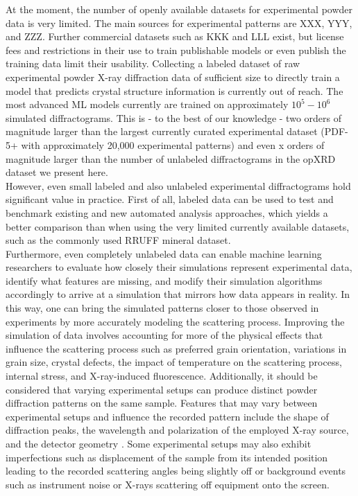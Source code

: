 At the moment, the number of openly available datasets for experimental powder data is very limited. The main sources for experimental patterns are XXX, YYY, and ZZZ. Further commercial datasets such as KKK and LLL exist, but license fees and restrictions in their use to train publishable models or even publish the training data limit their usability. Collecting a labeled dataset of raw experimental powder X-ray diffraction data of sufficient size to directly train a model that predicts crystal structure information is currently out of reach. The most advanced ML models currently are trained on approximately $10^5 - 10^6$ simulated diffractograms. \cite{Salgado2023, Schopmans2023}
This is - to the best of our knowledge - two orders of magnitude larger than the largest currently curated experimental dataset (PDF-5+ with approximately 20,000 experimental patterns) and even x orders of magnitude larger than the number of unlabeled diffractograms in the opXRD dataset we present here. \\

However, even small labeled and also unlabeled experimental diffractograms hold significant value in practice. First of all, labeled data can be used to test and benchmark existing and new automated analysis approaches, which yields a better comparison than when using the very limited currently available datasets, such as the commonly used RRUFF mineral dataset\cite{Armbruster2015}. \\

Furthermore, even completely unlabeled data can enable machine learning researchers to evaluate how closely their simulations represent experimental data, identify what features are missing, and modify their simulation algorithms accordingly to arrive at a simulation that mirrors how data appears in reality. In this way, one can bring the simulated patterns closer to those observed in experiments by more accurately modeling the scattering process.
Improving the simulation of data involves accounting for more of the physical effects that influence the scattering process such as preferred grain orientation, variations in grain size, crystal defects, the impact of temperature on the scattering process, internal stress, and X-ray-induced fluorescence\cite{cao2024simxrd, Waseda2011, Pecharsky2023}.  Additionally, it should be considered that varying experimental setups can produce distinct powder diffraction patterns on the same sample. Features that may vary between experimental setups and influence the recorded pattern include the shape of diffraction peaks, the wavelength and polarization of the employed X-ray source, and the detector geometry
\cite{Waseda2011, Pecharsky2023}. Some experimental setups may also exhibit imperfections such as displacement of the sample from its intended position leading to the recorded scattering angles being slightly off \cite{hulbert2023} or background events such as instrument noise or X-rays scattering off equipment onto the screen.\\

